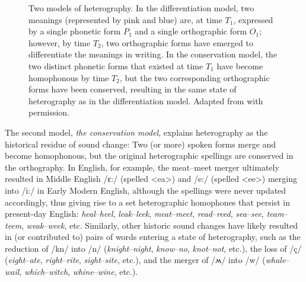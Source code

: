 \documentclass[doc,biblatex]{apa7}
\begin{document}
	\begin{figure}
	\vspace*{2pt}
	\caption{Two models of heterography. In the differentiation model, two meanings (represented by pink and blue) are, at time $T_1$, expressed by a single phonetic form $P_1$ and a single orthographic form $O_1$; however, by time $T_2$, two orthographic forms have emerged to differentiate the meanings in writing. In the conservation model, the two distinct phonetic forms that existed at time $T_1$ have become homophonous by time $T_2$, but the two corresponding orthographic forms have been conserved, resulting in the same state of heterography as in the differentiation model. Adapted from \textcite[pp.~325--326]{Berg:2021} with permission.}
	\label{models_of_heterography}
	\end{figure}

The second model, \textit{the conservation model}, explains heterography as the historical residue of sound change: Two (or more) spoken forms merge and become homophonous, but the original heterographic spellings are conserved in the orthography. In English, for example, the meat--meet merger ultimately resulted in Middle English /ɛ:/ (spelled <ea>) and /e:/ (spelled <ee>) merging into /i:/ in Early Modern English, although the spellings were never updated accordingly, thus giving rise to a set heterographic homophones that persist in present-day English: \textit{heal}--\textit{heel}, \textit{leak}--\textit{leek}, \textit{meat}--\textit{meet}, \textit{read}--\textit{reed}, \textit{sea}--\textit{see}, \textit{team}--\textit{teem}, \textit{weak}--\textit{week}, etc. Similarly, other historic sound changes have likely resulted in (or contributed to) pairs of words entering a state of heterography, such as the reduction of /kn/ into /n/ (\textit{knight}--\textit{night}, \textit{know}--\textit{no}, \textit{knot}--\textit{not}, etc.), the loss of /ç/ (\textit{eight}--\textit{ate}, \textit{right}--\textit{rite}, \textit{sight}--\textit{site}, etc.), and the merger of /ʍ/ into /w/ (\textit{whale}--\textit{wail}, \textit{which}--\textit{witch}, \textit{whine}--\textit{wine}, etc.).
\end{document}
